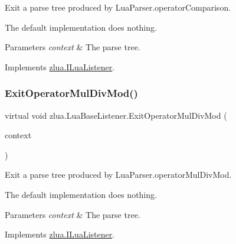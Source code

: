 Exit a parse tree produced by Lua\+Parser.\+operator\+Comparison. 

The default implementation does nothing.


\begin{DoxyParams}{Parameters}
{\em context} & The parse tree.\\
\hline
\end{DoxyParams}


Implements \mbox{\hyperlink{interfacezlua_1_1_i_lua_listener_a0c4de7c4814a744326fcf623c7ffc05c}{zlua.\+I\+Lua\+Listener}}.

\mbox{\label{classzlua_1_1_lua_base_listener_a686c3f75fd31a0b4c7cae3f3b99cd2aa}} 
\subsubsection{\texorpdfstring{Exit\+Operator\+Mul\+Div\+Mod()}{ExitOperatorMulDivMod()}}
{\footnotesize\ttfamily virtual void zlua.\+Lua\+Base\+Listener.\+Exit\+Operator\+Mul\+Div\+Mod (\begin{DoxyParamCaption}\item[{\mbox{[}\+Not\+Null\mbox{]} \mbox{\hyperlink{classzlua_1_1_lua_parser_1_1_operator_mul_div_mod_context}{Lua\+Parser.\+Operator\+Mul\+Div\+Mod\+Context}}}]{context }\end{DoxyParamCaption})\hspace{0.3cm}{\ttfamily [virtual]}}



Exit a parse tree produced by Lua\+Parser.\+operator\+Mul\+Div\+Mod. 

The default implementation does nothing.


\begin{DoxyParams}{Parameters}
{\em context} & The parse tree.\\
\hline
\end{DoxyParams}


Implements \mbox{\hyperlink{interfacezlua_1_1_i_lua_listener_a67436f1864c243aabc07a339c1c96085}{zlua.\+I\+Lua\+Listener}}.

\mbox{\label{classzlua_1_1_lua_base_listener_ab2ff587916dcc9fe3b47ee7b560db090}} 
